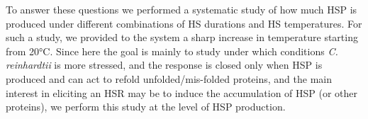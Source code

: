 \documentclass[oneside, 10pt, a4paper, twocolumn]{article}
\begin{document}

To answer these questions we performed a systematic study of how much HSP is produced under different combinations of HS durations and HS temperatures. 
For such a study, we provided to the system a sharp increase in temperature starting from 20°C. 
Since here the goal is mainly to study under which conditions \emph{C. reinhardtii} is more stressed, and the response is closed only when HSP is produced and can act to refold unfolded/mis-folded proteins, 
and the main interest in eliciting an HSR may be to induce the accumulation of HSP (or other proteins), 
we perform this study at the level of HSP production. %
\end{document}

